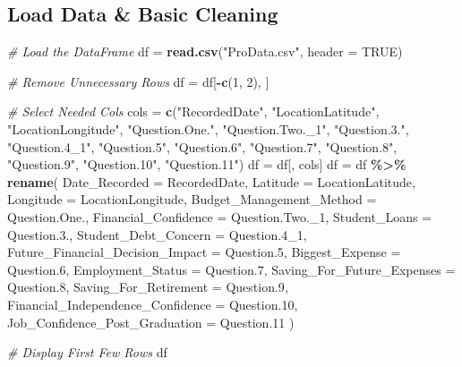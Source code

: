 \documentclass[
]{article}
\newenvironment{Shaded}{\begin{snugshade}}{\end{snugshade}}
\newcommand{\AttributeTok}[1]{\textcolor[rgb]{0.13,0.29,0.53}{#1}}
\newcommand{\CommentTok}[1]{\textcolor[rgb]{0.56,0.35,0.01}{\textit{#1}}}
\newcommand{\ConstantTok}[1]{\textcolor[rgb]{0.56,0.35,0.01}{#1}}
\newcommand{\DecValTok}[1]{\textcolor[rgb]{0.00,0.00,0.81}{#1}}
\newcommand{\FloatTok}[1]{\textcolor[rgb]{0.00,0.00,0.81}{#1}}
\newcommand{\FunctionTok}[1]{\textcolor[rgb]{0.13,0.29,0.53}{\textbf{#1}}}
\newcommand{\NormalTok}[1]{#1}
\newcommand{\OtherTok}[1]{\textcolor[rgb]{0.56,0.35,0.01}{#1}}
\newcommand{\SpecialCharTok}[1]{\textcolor[rgb]{0.81,0.36,0.00}{\textbf{#1}}}
\newcommand{\StringTok}[1]{\textcolor[rgb]{0.31,0.60,0.02}{#1}}
\begin{document}
\subsection{Load Data \& Basic Cleaning}\label{load-data-basic-cleaning}

\begin{Shaded}
\begin{Highlighting}[]
\CommentTok{\# Load the DataFrame}
\NormalTok{df }\OtherTok{=} \FunctionTok{read.csv}\NormalTok{(}\StringTok{"ProData.csv"}\NormalTok{, }\AttributeTok{header =} \ConstantTok{TRUE}\NormalTok{)}

\CommentTok{\# Remove Unnecessary Rows}
\NormalTok{df }\OtherTok{=}\NormalTok{ df[}\SpecialCharTok{{-}}\FunctionTok{c}\NormalTok{(}\DecValTok{1}\NormalTok{, }\DecValTok{2}\NormalTok{), ]}

\CommentTok{\# Select Needed Cols}
\NormalTok{cols }\OtherTok{=} \FunctionTok{c}\NormalTok{(}\StringTok{"RecordedDate"}\NormalTok{, }\StringTok{"LocationLatitude"}\NormalTok{, }\StringTok{"LocationLongitude"}\NormalTok{, }\StringTok{"Question.One."}\NormalTok{, }\StringTok{"Question.Two.\_1"}\NormalTok{, }\StringTok{"Question.3."}\NormalTok{, }\StringTok{"Question.4\_1"}\NormalTok{, }\StringTok{"Question.5"}\NormalTok{, }\StringTok{"Question.6"}\NormalTok{, }\StringTok{"Question.7"}\NormalTok{, }\StringTok{"Question.8"}\NormalTok{, }\StringTok{"Question.9"}\NormalTok{, }\StringTok{"Question.10"}\NormalTok{, }\StringTok{"Question.11"}\NormalTok{)}
\NormalTok{df }\OtherTok{=}\NormalTok{ df[, cols]}
\NormalTok{df }\OtherTok{=}\NormalTok{ df }\SpecialCharTok{\%\textgreater{}\%}
  \FunctionTok{rename}\NormalTok{(}
    \AttributeTok{Date\_Recorded =}\NormalTok{ RecordedDate,}
    \AttributeTok{Latitude =}\NormalTok{ LocationLatitude,}
    \AttributeTok{Longitude =}\NormalTok{ LocationLongitude,}
    \AttributeTok{Budget\_Management\_Method =}\NormalTok{ Question.One.,}
    \AttributeTok{Financial\_Confidence =}\NormalTok{ Question.Two.\_1,}
    \AttributeTok{Student\_Loans =}\NormalTok{ Question.}\FloatTok{3.}\NormalTok{,}
    \AttributeTok{Student\_Debt\_Concern =}\NormalTok{ Question}\FloatTok{.4}\NormalTok{\_1,}
    \AttributeTok{Future\_Financial\_Decision\_Impact =}\NormalTok{ Question}\FloatTok{.5}\NormalTok{,}
    \AttributeTok{Biggest\_Expense =}\NormalTok{ Question}\FloatTok{.6}\NormalTok{,}
    \AttributeTok{Employment\_Status =}\NormalTok{ Question}\FloatTok{.7}\NormalTok{,}
    \AttributeTok{Saving\_For\_Future\_Expenses =}\NormalTok{ Question}\FloatTok{.8}\NormalTok{,}
    \AttributeTok{Saving\_For\_Retirement =}\NormalTok{ Question}\FloatTok{.9}\NormalTok{,}
    \AttributeTok{Financial\_Independence\_Confidence =}\NormalTok{ Question}\FloatTok{.10}\NormalTok{,}
    \AttributeTok{Job\_Confidence\_Post\_Graduation =}\NormalTok{ Question}\FloatTok{.11}
\NormalTok{  )}

\CommentTok{\# Display First Few Rows}
\NormalTok{df}
\end{Highlighting}
\end{Shaded}
\end{document}
